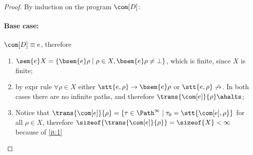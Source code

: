 \begin{proof}
  By induction on the program \(\com[D]\):
  \paragraph*{Base case:\\}
  \(\com[D] \equiv e\), therefore
  \begin{enumerate}[label=(\roman*).]
  \item \label{it:1}
    \(\sem{e}X = \{\bsem{e}\rho \mid \rho \in X , \bsem{e}\rho \neq
    \bot\}\), which is finite, since \(X\) is finite;
  \item \label{it:2} by expr rule \(\forall \rho \in X\) either
    \(\stt{e,\rho} \to \bsem{e}\rho\) or \(\stt{e,\rho} \not\to\). In
    both cases there are no infinite paths, and therefore
    \(\trans{\com[e]}{\rho} \ahalts\);
  \item Notice that
    \(\trans{\com[e]}{\rho} = \{\tau \in \Path^\infty \mid \tau_0 =
    \stt{\com[e], \rho}\}\) for all \(\rho \in X\), therefore
    \(\sizeof{\trans{\com[e]}{\rho}} = \sizeof{X} < \infty\) because
    of \ref{it:1}
  \end{enumerate}
  

\end{proof}
